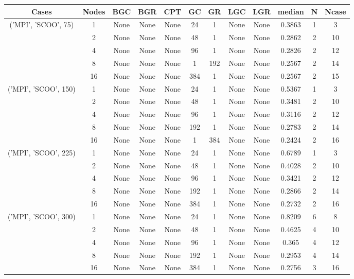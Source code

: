 \begin{tabular}{cccccccccccc}
\hline
Cases & Nodes& BGC& BGR& CPT& GC& GR& LGC& LGR& median & N & Ncase \\
\hline
\multirow{5}{*}{('MPI', 'SCOO', 75)}& 1& None& None& None& 24& 1& None& None& 0.3863& 1& 3\\
& 2& None& None& None& 48& 1& None& None& 0.2862& 2& 10\\
& 4& None& None& None& 96& 1& None& None& 0.2826& 2& 12\\
& 8& None& None& None& 1& 192& None& None& 0.2567& 2& 14\\
& 16& None& None& None& 384& 1& None& None& 0.2567& 2& 15\\
\hline
\multirow{5}{*}{('MPI', 'SCOO', 150)}& 1& None& None& None& 24& 1& None& None& 0.5367& 1& 3\\
& 2& None& None& None& 48& 1& None& None& 0.3481& 2& 10\\
& 4& None& None& None& 96& 1& None& None& 0.3116& 2& 12\\
& 8& None& None& None& 192& 1& None& None& 0.2783& 2& 14\\
& 16& None& None& None& 1& 384& None& None& 0.2424& 2& 16\\
\hline
\multirow{5}{*}{('MPI', 'SCOO', 225)}& 1& None& None& None& 24& 1& None& None& 0.6789& 1& 3\\
& 2& None& None& None& 48& 1& None& None& 0.4028& 2& 10\\
& 4& None& None& None& 96& 1& None& None& 0.3421& 2& 12\\
& 8& None& None& None& 192& 1& None& None& 0.2866& 2& 14\\
& 16& None& None& None& 384& 1& None& None& 0.2732& 2& 16\\
\hline
\multirow{5}{*}{('MPI', 'SCOO', 300)}& 1& None& None& None& 24& 1& None& None& 0.8209& 6& 8\\
& 2& None& None& None& 48& 1& None& None& 0.4625& 4& 10\\
& 4& None& None& None& 96& 1& None& None& 0.365& 4& 12\\
& 8& None& None& None& 192& 1& None& None& 0.2953& 4& 14\\
& 16& None& None& None& 384& 1& None& None& 0.2756& 3& 16\\
\hline
\end{tabular}




